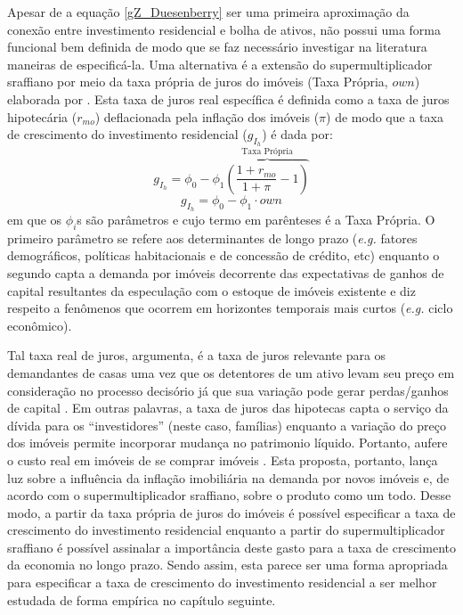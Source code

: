 Apesar de a equação \ref{gZ_Duesenberry} ser uma primeira aproximação da conexão entre investimento residencial e bolha de ativos, não possui uma forma funcional bem definida de modo que se faz necessário investigar na literatura maneiras de especificá-la.
Uma alternativa é a extensão do supermultiplicador sraffiano por meio da taxa própria de juros do imóveis (Taxa Própria, $own$) elaborada por \textcite{teixeira_crescimento_2015}. 
Esta taxa de juros real específica é definida como a taxa de juros hipotecária ($r_{mo}$) deflacionada pela inflação dos imóveis ({$\pi$}) de modo que a taxa de crescimento do investimento residencial ($g_{I_h}$) é dada por:
$$
g_{I_h} = \phi_0 - \phi_1 \overbrace{\left(\frac{1+r_{mo}}{1+\pi} - 1\right)}^{\text{Taxa Própria}}
$$
\begin{equation}
\label{tx_Propria}
g_{I_h} = \phi_0 - \phi_1\cdot own
\end{equation}
em que os $\phi_i$s são parâmetros e cujo termo em parênteses é a Taxa Própria. 
O primeiro parâmetro se refere aos determinantes de longo prazo (\textit{e.g.} fatores demográficos, políticas habitacionais e de concessão de crédito, etc) enquanto o segundo capta a demanda por imóveis decorrente das expectativas de ganhos de capital resultantes da especulação com o estoque de imóveis existente e diz respeito a fenômenos que ocorrem em horizontes temporais mais curtos (\textit{e.g.} ciclo econômico). 

Tal taxa real de juros, argumenta, é a taxa de juros relevante para os demandantes de casas uma vez que os detentores de um ativo levam seu preço em consideração no processo decisório já que sua variação pode gerar perdas/ganhos de capital \cite[p.~144]{teixeira_crescimento_2015}.
Em outras palavras, a taxa de juros das hipotecas capta o serviço da dívida para os ``investidores'' (neste caso, famílias) enquanto a variação do preço dos imóveis permite incorporar mudança no patrimonio líquido. Portanto, aufere o custo real em imóveis de se comprar imóveis \cite[p.~53]{teixeira_crescimento_2015}. 
Esta proposta, portanto, lança luz sobre a influência da inflação imobiliária na demanda por novos imóveis e, de acordo com o supermultiplicador sraffiano, sobre o produto como um todo. 
Desse modo, a partir da taxa própria de juros do imóveis é possível especificar a taxa de crescimento do investimento residencial enquanto a partir do supermultiplicador sraffiano é possível assinalar a importância deste gasto para a taxa de crescimento da economia no longo prazo.  
Sendo assim, esta parece ser uma forma apropriada para especificar a taxa de crescimento do investimento residencial a ser melhor estudada de forma empírica no capítulo seguinte.


